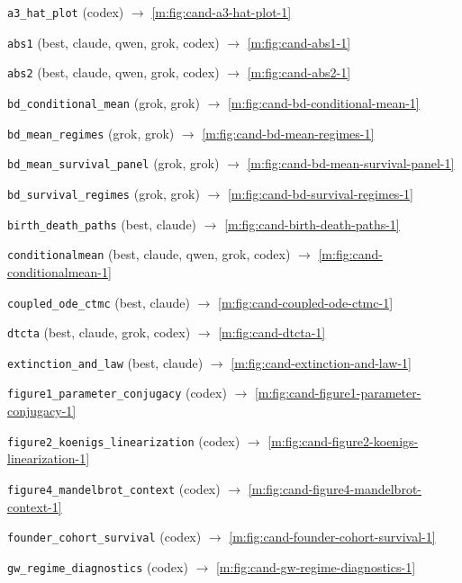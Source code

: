 \begingroup\footnotesize\raggedright
\setlength{\parskip}{1.5pt}\setlength{\parindent}{0pt}
\texttt{a3\_hat\_plot}  (codex) \quad $\rightarrow$ \cref{m:fig:cand-a3-hat-plot-1}\par
\texttt{abs1}  (best, claude, qwen, grok, codex) \quad $\rightarrow$ \cref{m:fig:cand-abs1-1}\par
\texttt{abs2}  (best, claude, qwen, grok, codex) \quad $\rightarrow$ \cref{m:fig:cand-abs2-1}\par
\texttt{bd\_conditional\_mean}  (grok, grok) \quad $\rightarrow$ \cref{m:fig:cand-bd-conditional-mean-1}\par
\texttt{bd\_mean\_regimes}  (grok, grok) \quad $\rightarrow$ \cref{m:fig:cand-bd-mean-regimes-1}\par
\texttt{bd\_mean\_survival\_panel}  (grok, grok) \quad $\rightarrow$ \cref{m:fig:cand-bd-mean-survival-panel-1}\par
\texttt{bd\_survival\_regimes}  (grok, grok) \quad $\rightarrow$ \cref{m:fig:cand-bd-survival-regimes-1}\par
\texttt{birth\_death\_paths}  (best, claude) \quad $\rightarrow$ \cref{m:fig:cand-birth-death-paths-1}\par
\texttt{conditionalmean}  (best, claude, qwen, grok, codex) \quad $\rightarrow$ \cref{m:fig:cand-conditionalmean-1}\par
\texttt{coupled\_ode\_ctmc}  (best, claude) \quad $\rightarrow$ \cref{m:fig:cand-coupled-ode-ctmc-1}\par
\texttt{dtcta}  (best, claude, grok, codex) \quad $\rightarrow$ \cref{m:fig:cand-dtcta-1}\par
\texttt{extinction\_and\_law}  (best, claude) \quad $\rightarrow$ \cref{m:fig:cand-extinction-and-law-1}\par
\texttt{figure1\_parameter\_conjugacy}  (codex) \quad $\rightarrow$ \cref{m:fig:cand-figure1-parameter-conjugacy-1}\par
\texttt{figure2\_koenigs\_linearization}  (codex) \quad $\rightarrow$ \cref{m:fig:cand-figure2-koenigs-linearization-1}\par
\texttt{figure4\_mandelbrot\_context}  (codex) \quad $\rightarrow$ \cref{m:fig:cand-figure4-mandelbrot-context-1}\par
\texttt{founder\_cohort\_survival}  (codex) \quad $\rightarrow$ \cref{m:fig:cand-founder-cohort-survival-1}\par
\texttt{gw\_regime\_diagnostics}  (codex) \quad $\rightarrow$ \cref{m:fig:cand-gw-regime-diagnostics-1}\par
